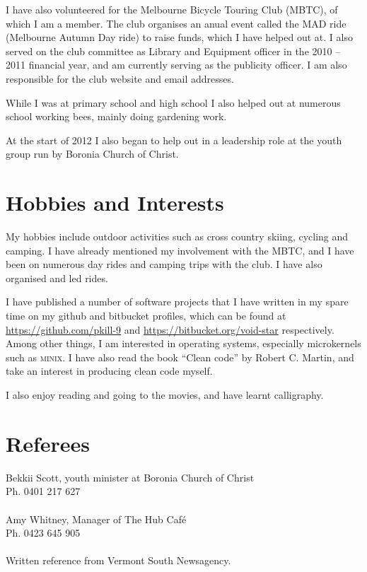 \documentclass[a4paper]{article}
\begin{document}
I have also volunteered for the Melbourne Bicycle Touring Club (MBTC), of
which I am a member. The club organises an anual event called the MAD ride
(Melbourne Autumn Day ride) to raise funds, which I have helped out at. I
also served on the club committee as Library and Equipment officer in the
2010 -- 2011 financial year, and am currently serving as the publicity
officer. I am also responsible for the club website and email addresses.

While I was at primary school and high school I also helped out at
numerous school working bees, mainly doing gardening work.

At the start of 2012 I also began to help out in a leadership role at the
youth group run by Boronia Church of Christ.


\section{Hobbies and Interests}
My hobbies include outdoor activities such as cross country skiing, cycling
and camping. I have already mentioned my involvement with the MBTC, and I
have been on numerous day rides and camping trips with the club. I have
also organised and led rides.

I have published a number of software projects that I have written in my
spare time on my github and bitbucket profiles, which can be found at
\url{https://github.com/pkill-9} and \url{https://bitbucket.org/void-star}
respectively. Among other things, I am interested in operating systems,
especially microkernels such as \textsc{minix}. I have also read the book
``Clean code'' by Robert C. Martin, and take an interest in producing clean
code myself.


I also enjoy reading and going to the movies, and have learnt calligraphy.



\section{Referees}
Bekkii Scott, youth minister at Boronia Church of Christ \\
Ph. 0401 217 627\\ \\
Amy Whitney, Manager of The Hub Caf\'e \\
Ph. 0423 645 905\\ \\
Written reference from Vermont South Newsagency.

\end{document}
